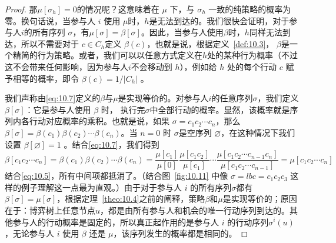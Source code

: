 \begin{proof}
那\(\mu \left\lbrack  {\sigma }_{h}\right\rbrack   = 0\)的情况呢？这意味着在 \(\mu\) 下，与 \({\sigma }_{h}\) 一致的纯策略的概率为零。换句话说，当参与人 \(i\) 使用 \(\mu\)时，\(h\)是无法到达的。我们很快会证明，对于参与人\(i\)的所有序列 \(\sigma\)，有\(\mu \left\lbrack  \sigma \right\rbrack   = \beta \left\lbrack  \sigma \right\rbrack\)。因此，当参与人使用\(\beta\)时，\(h\)同样无法到达，所以不需要对于 \(c \in  {C}_{h}\)定义 \(\beta \left( c\right)\)，也就是说，根据定义~\ref{def:10.3}， \(\beta\)是一个精简的行为策略。或者，我们可以以任意方式定义在\(h\)处的某种行为概率（不过这不会带来任何影响，因为参与人\(i\)不会移动到 \(h\)），例如给 \(h\) 处的每个行动 \(c\) 赋予相等的概率，即令 \(\beta \left( c\right)  = 1/\left| {C}_{h}\right|\) 。

我们声称由\eqref{eq:10.7}定义的\(\beta\)与\(\mu\)是实现等价的。对参与人\(i\)的任意序列\(\sigma\)，我们定义 \(\beta \left\lbrack  \sigma \right\rbrack\)：它是参与人使用 \(\beta\) 时， 执行完\(\sigma\)中全部行动的概率。显然，该概率就是序列内各行动对应概率的乘积。也就是说，如果 \(\sigma  = {c}_{1}{c}_{2}\cdots {c}_{n}\)，那么 \(\beta \left\lbrack  \sigma \right\rbrack   = \beta \left( {c}_{1}\right) \beta \left( {c}_{2}\right) \cdots \beta \left( {c}_{n}\right)\)。当 \(n = 0\) 时 \(\sigma\)是空序列 \(\varnothing\)，在这种情况下我们设置 \(\beta \left\lbrack  \varnothing \right\rbrack = 1\) 。结合\eqref{eq:10.7}，我们得到
\[
\beta \left\lbrack  {{c}_{1}{c}_{2}\cdots {c}_{n}}\right\rbrack   = \beta \left( {c}_{1}\right) \beta \left( {c}_{2}\right) \cdots \beta \left( {c}_{n}\right)  = \frac{\mu \left\lbrack  {c}_{1}\right\rbrack  }{\mu \left\lbrack  0\right\rbrack  }\frac{\mu \left\lbrack  {{c}_{1}{c}_{2}}\right\rbrack  }{\mu \left\lbrack  {c}_{1}\right\rbrack  }\cdots \frac{\mu \left\lbrack  {{c}_{1}{c}_{2}\cdots {c}_{n - 1}{c}_{n}}\right\rbrack  }{\mu \left\lbrack  {{c}_{1}{c}_{2}\cdots {c}_{n - 1}}\right\rbrack  } = \mu \left\lbrack  {{c}_{1}{c}_{2}\cdots {c}_{n}}\right\rbrack
\]结合\eqref{eq:10.5}，所有中间项都抵消了。（结合图~\ref{fig:10.11} 中像 \(\sigma  = {lbc} = {c}_{1}{c}_{2}{c}_{3}\) 这样的例子理解这一点最为直观。）由于对于参与人 \(i\) 的所有序列\(\sigma\)都有 \(\beta \left\lbrack  \sigma \right\rbrack   = \mu \left\lbrack  \sigma \right\rbrack\)，根据定理~\ref{theo:10.4}之前的阐释，策略\(\beta\)和\(\mu\)是实现等价的；原因在于：博弈树上任意节点$u$，都是由所有参与人和机会的唯一行动序列到达的。其他参与人的行动概率是固定的，所以真正起作用的是参与人 \(i\) 的行动序列\({\sigma }^{i}\left( u\right)\)，无论参与人 \(i\) 使用 \(\beta\) 还是 \(\mu\)，该序列发生的概率都是相同的。\end{proof}

